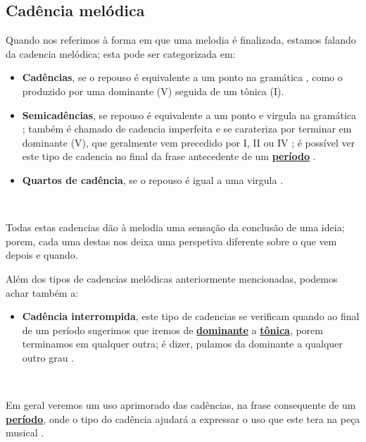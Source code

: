 \subsection{Cadência melódica} 
\label{subsec:cadenciamelodica}
Quando nos referimos à forma em que uma melodia é finalizada,
estamos falando da cadencia melódica; esta pode ser categorizada em: 
\begin{itemize}
\item \textbf{Cadências}, se o repouso é equivalente a um ponto na gramática \cite[pp. 66,67]{melcior1859diccionario},
como o produzido por uma dominante (V) seguida de um tônica (I).
\item \textbf{Semicadências}, se repouso é equivalente a um ponto e virgula na gramática \cite[pp. 66,67]{melcior1859diccionario};
também é chamado de cadencia imperfeita e se carateriza por terminar em dominante (V),
que geralmente vem precedido por  I, II ou IV \cite[pp. 103]{grabner2001teoria}; 
é possível ver este tipo de cadencia no final da frase antecedente de um 
\hyperref[sec:Periodo]{\textbf{período}} \cite[pp. 21]{latham2008diccionario}.
\item \textbf{Quartos de cadência}, se o repouso é igual a uma virgula \cite[pp. 66,67]{melcior1859diccionario}.
\end{itemize}~

Todas estas cadencias dão à melodia uma sensação da conclusão de uma ideia; 
porem, cada uma destas nos deixa uma perspetiva diferente sobre o que vem depois e quando.

Além dos tipos de cadencias melódicas anteriormente mencionadas, podemos achar também a:
\begin{itemize}
\item \textbf{Cadência interrompida}, este tipo de cadencias se verificam 
quando ao final de um período sugerimos que iremos de 
\hyperref[sec:dominante]{\textbf{dominante}} a \hyperref[sec:Tonica]{\textbf{tônica}},
porem terminamos em qualquer outra; é dizer, pulamos da dominante a qualquer outro grau 
\cite[pp. 67]{melcior1859diccionario} \cite[pp. 60]{pedrell2009diccionario}. 
\end{itemize}~

Em geral veremos um uso aprimorado das cadências, na frase consequente de um \hyperref[sec:Periodo]{\textbf{período}},
onde o tipo do cadência ajudará a expressar o uso que este tera na peça musical  \cite[pp. 66,67]{melcior1859diccionario}.


